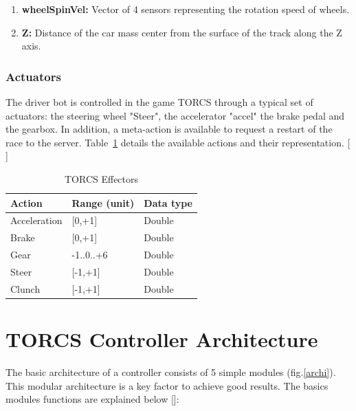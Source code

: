 \documentclass{llncs}
\begin{document}
\begin{enumerate}
\begin{figure}[h!]
		
	\end{figure}
	
	
	\item \textbf{wheelSpinVel:}  Vector of 4 sensors representing the rotation speed of wheels.\\
	\item \textbf{Z:}  Distance of the car mass center from the surface of the track along the Z axis.
	
\end{enumerate}

\subsubsection{Actuators}

The driver bot is controlled in the game TORCS through a  typical set of actuators: the steering wheel "Steer", the accelerator "accel" the brake pedal and the gearbox. In addition, a meta-action is available to request a restart of the race to the server. Table~\ref{tab2}  details the available actions and their representation. [\cite {torcs} ]


\begin{table}[h!]
	
	\begin{tabular}{|p{3cm}|p{3 cm}|p{6 cm}|}
		\hline
		
		{\textbf{Action} }&
		{\textbf{Range} (unit)} &  
		{\textbf{Data type}}\\ 
		\hline
		Acceleration & [0,+1] & Double\\ 
		\hline
		Brake & [0,+1]	& Double\\
		\hline
		Gear & -1..0..+6	& Double\\
		\hline
		Steer & [-1,+1]	& Double\\
		\hline
		Clunch & [-1,+1]	& Double\\
		\hline
	\end{tabular}
	
	\caption{TORCS Effectors}
	\label{tab2}
\end{table}




\section{TORCS Controller Architecture}
The basic architecture of a controller consists of 5 simple modules (fig.\ref{archi}). This modular architecture  is a key factor to achieve good results. The basics modules functions  are explained below [\cite{fuzzy}]:
\end{document}
